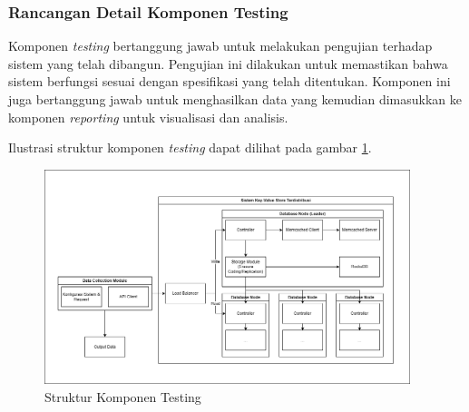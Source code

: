 \subsubsection{Rancangan Detail Komponen Testing}
\label{subsubsection:detail-data-testing}

Komponen \textit{testing} bertanggung jawab untuk melakukan pengujian terhadap sistem yang telah dibangun. Pengujian ini dilakukan untuk memastikan bahwa sistem berfungsi sesuai dengan spesifikasi yang telah ditentukan. Komponen ini juga bertanggung jawab untuk menghasilkan data yang kemudian dimasukkan ke komponen \textit{reporting} untuk visualisasi dan analisis.

Ilustrasi struktur komponen \textit{testing} dapat dilihat pada gambar \ref{fig:testing-structure}.

\begin{figure}[ht]
    \centering
    \includegraphics[width=0.95\textwidth]{resources/chapter-3/general-architecture.png}
    \caption{Struktur Komponen Testing}
    \label{fig:testing-structure}
\end{figure}